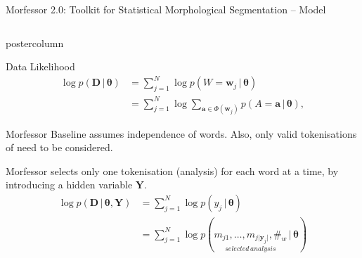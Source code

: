 \documentclass[final]{beamer} %
\newcommand{\mat}[1]{\mathbf{#1}}
\newcommand{\seq}[1]{\boldsymbol{#1}}
\newcommand{\len}[1]{\lvert#1\rvert}
\newcommand{\params}{\boldsymbol{\theta}}
\newcommand{\data}{\seq{D}}
\newcommand{\tokenset}{\Phi}
\newcommand{\bound}{\#}
\newcommand{\vb}{\,|\,}
\newcommand{\Y}{\mat{Y}}
\begin{document}
\begin{frame}{Morfessor 2.0: Toolkit for Statistical Morphological Segmentation -- Model}
\begin{columns}
\begin{column}{.4\textwidth}
      \begin{beamercolorbox}[center,wd=\textwidth]{postercolumn}
 \begin{block}{Data Likelihood}
\begin{align*}
  \log p(\data \vb \params)
  & = \sum_{j=1}^{N} \log p(W=\seq{w}_j \vb \params) \nonumber \\
  & = \sum_{j=1}^{N} \log \sum_{\seq{a} \in \tokenset(\seq{w}_j)}
  p(A=\seq{a} \vb \params),
\end{align*}

Morfessor Baseline assumes independence of words. Also, only valid tokenisations of need to be considered.

Morfessor selects only one tokenisation (analysis) for each word at a time, by introducing a hidden variable $\Y$. 
\begin{align*}
  \log p(\data \vb \params, \Y)
  & = \sum_{j=1}^{N} \log 
  p(y_j \vb \params) 
  \\&= \sum_{j=1}^{N} \log 
  p(\underset{selected\,analysis}{m_{j1}, \ldots, m_{j\len{\seq{y}_j}}, \bound_w} \vb \params) 
\label{eq:morphylikelihood}
\end{align*}

            \end{block}
	\end{beamercolorbox}



\end{column}
\end{columns}
\end{frame}
\end{document}
